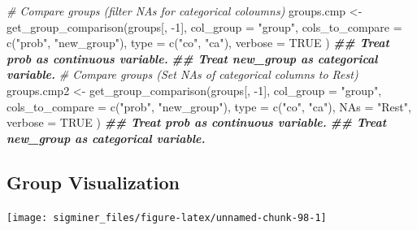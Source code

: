 \documentclass[
  12pt,
  a4paper,
  twoside]{book}
\newenvironment{Shaded}{\begin{snugshade}}{\end{snugshade}}
\newcommand{\AttributeTok}[1]{\textcolor[rgb]{0.77,0.63,0.00}{#1}}
\newcommand{\CommentTok}[1]{\textcolor[rgb]{0.56,0.35,0.01}{\textit{#1}}}
\newcommand{\ConstantTok}[1]{\textcolor[rgb]{0.00,0.00,0.00}{#1}}
\newcommand{\DecValTok}[1]{\textcolor[rgb]{0.00,0.00,0.81}{#1}}
\newcommand{\DocumentationTok}[1]{\textcolor[rgb]{0.56,0.35,0.01}{\textbf{\textit{#1}}}}
\newcommand{\FunctionTok}[1]{\textcolor[rgb]{0.00,0.00,0.00}{#1}}
\newcommand{\NormalTok}[1]{#1}
\newcommand{\OtherTok}[1]{\textcolor[rgb]{0.56,0.35,0.01}{#1}}
\newcommand{\SpecialCharTok}[1]{\textcolor[rgb]{0.00,0.00,0.00}{#1}}
\newcommand{\StringTok}[1]{\textcolor[rgb]{0.31,0.60,0.02}{#1}}
\begin{document}
\begin{Shaded}
\begin{Highlighting}[]
\CommentTok{\# Compare groups (filter NAs for categorical coloumns)}
\NormalTok{groups.cmp }\OtherTok{\textless{}{-}} \FunctionTok{get\_group\_comparison}\NormalTok{(groups[, }\SpecialCharTok{{-}}\DecValTok{1}\NormalTok{],}
  \AttributeTok{col\_group =} \StringTok{"group"}\NormalTok{,}
  \AttributeTok{cols\_to\_compare =} \FunctionTok{c}\NormalTok{(}\StringTok{"prob"}\NormalTok{, }\StringTok{"new\_group"}\NormalTok{),}
  \AttributeTok{type =} \FunctionTok{c}\NormalTok{(}\StringTok{"co"}\NormalTok{, }\StringTok{"ca"}\NormalTok{), }\AttributeTok{verbose =} \ConstantTok{TRUE}
\NormalTok{)}
\DocumentationTok{\#\# Treat prob as continuous variable.}
\DocumentationTok{\#\# Treat new\_group as categorical variable.}
\CommentTok{\# Compare groups (Set NAs of categorical columns to \textquotesingle{}Rest\textquotesingle{})}
\NormalTok{groups.cmp2 }\OtherTok{\textless{}{-}} \FunctionTok{get\_group\_comparison}\NormalTok{(groups[, }\SpecialCharTok{{-}}\DecValTok{1}\NormalTok{],}
  \AttributeTok{col\_group =} \StringTok{"group"}\NormalTok{,}
  \AttributeTok{cols\_to\_compare =} \FunctionTok{c}\NormalTok{(}\StringTok{"prob"}\NormalTok{, }\StringTok{"new\_group"}\NormalTok{),}
  \AttributeTok{type =} \FunctionTok{c}\NormalTok{(}\StringTok{"co"}\NormalTok{, }\StringTok{"ca"}\NormalTok{), }\AttributeTok{NAs =} \StringTok{"Rest"}\NormalTok{, }\AttributeTok{verbose =} \ConstantTok{TRUE}
\NormalTok{)}
\DocumentationTok{\#\# Treat prob as continuous variable.}
\DocumentationTok{\#\# Treat new\_group as categorical variable.}
\end{Highlighting}
\end{Shaded}

\hypertarget{group-visualization}{%
\subsection{Group Visualization}\label{group-visualization}}

\begin{Shaded}
\end{Shaded}

\texttt{[image: sigminer\_files/figure-latex/unnamed-chunk-98-1]}

\begin{Shaded}
\end{Shaded}
\end{document}
